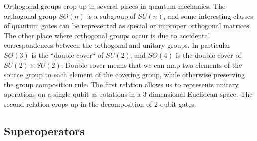 Orthogonal groups crop up in several places in quantum mechanics. The orthogonal group $SO(n)$ is a subgroup of $SU(n)$, and some interesting classes of quantum gates can be represented as special or improper orthogonal matrices. The other place where orthogonal groups occur is due to accidental correspondences between the orthogonal and unitary groups. In particular $SO(3)$ is the ``double cover`` of $SU(2)$, and $SO(4)$ is the double cover of $SU(2)\times SU(2)$. Double cover means that we can map two elements of the source group to each element of the covering group, while otherwise preserving the group composition rule.  The first relation allows us to represents unitary operations on a single qubit as rotations in a 3-dimensional Euclidean space. The second relation crops up in the decomposition of 2-qubit gates.
\label{accidental}






\subsection{Superoperators}



